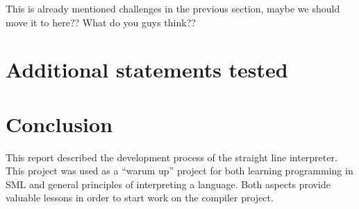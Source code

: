 \documentclass[a4paper]{article}
\begin{document}
This is already mentioned challenges in the previous section, maybe we should move it to here?? What do you guys think??

\section{Additional statements tested}

\section{Conclusion}
This report described the development process of the straight line interpreter. This project was used as a ``warum up'' project for both learning programming in SML and general principles of interpreting a language. Both aspects provide valuable lessons in order to start work on the compiler project. 
\end{document}
